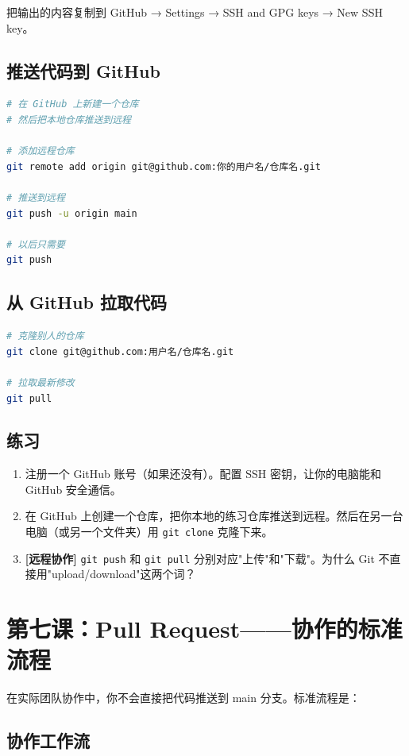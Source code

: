 \documentclass[a4paper,12pt]{ctexart}
\begin{document}
把输出的内容复制到 GitHub → Settings → SSH and GPG keys → New SSH key。

\subsection*{推送代码到 GitHub}

\begin{lstlisting}[language=bash]
# 在 GitHub 上新建一个仓库
# 然后把本地仓库推送到远程

# 添加远程仓库
git remote add origin git@github.com:你的用户名/仓库名.git

# 推送到远程
git push -u origin main

# 以后只需要
git push
\end{lstlisting}

\subsection*{从 GitHub 拉取代码}

\begin{lstlisting}[language=bash]
# 克隆别人的仓库
git clone git@github.com:用户名/仓库名.git

# 拉取最新修改
git pull
\end{lstlisting}

\subsection*{练习}

\begin{enumerate}
  \item 注册一个 GitHub 账号（如果还没有）。配置 SSH 密钥，让你的电脑能和 GitHub 安全通信。
  \item 在 GitHub 上创建一个仓库，把你本地的练习仓库推送到远程。然后在另一台电脑（或另一个文件夹）用 \texttt{git clone} 克隆下来。
  \item \textbf{[远程协作]} \texttt{git push} 和 \texttt{git pull} 分别对应"上传"和"下载"。为什么 Git 不直接用"upload/download"这两个词？
\end{enumerate}

\section*{第七课：Pull Request——协作的标准流程}

在实际团队协作中，你不会直接把代码推送到 main 分支。标准流程是：

\subsection*{协作工作流}
\end{document}
